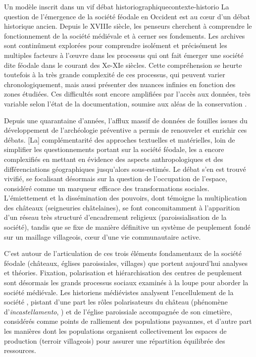 \medskip 
\begin{encadre}{Un modèle inscrit dans un vif débat historiographique}{contexte-historio}
\renewcommand{\thempfootnote}{\alph{mpfootnote}}	
\noindent \og
La question de l'émergence de la société féodale en Occident est au cœur d'un débat historique ancien.
Depuis le XVIIIe siècle, les penseurs cherchent à comprendre le fonctionnement de la société médiévale et à cerner ses fondements.
Les archives sont continûment explorées pour comprendre isolément et précisément les multiples facteurs à l'œuvre dans les processus qui ont fait émerger une société dite \og féodale\fg{} dans le courant des Xe-XIe siècles.
Cette compréhension se heurte toutefois à la très grande complexité de ces processus, qui peuvent varier chronologiquement, mais aussi présenter des nuances infinies en fonction des zones étudiées.
Ces difficultés sont encore amplifiées par l'accès aux données, très variable selon l'état de la documentation, soumise aux aléas de la conservation \textelp{}.

Depuis une quarantaine d'années, l'afflux massif de données de fouilles issues du développement de l'archéologie préventive a permis de renouveler et enrichir ces débats\textelp{}.
[La] complémentarité des approches textuelles et matérielles, loin de simplifier les questionnements portant sur la société féodale, les a encore complexifiés en mettant en évidence des aspects anthropologiques et des différenciations géographiques jusqu'alors sous-estimés.
Le débat s'en est trouvé vivifié, se focalisant désormais sur la question de l'occupation de l'espace, considéré comme un marqueur efficace des transformations sociales.
L'émiettement et la dissémination des pouvoirs, dont témoigne la multiplication des châteaux (seigneuries châtelaines), se font concomitamment à l'apparition d'un réseau très structuré d'encadrement religieux (paroissialisation de la société), tandis que se fixe de manière définitive un système de peuplement fondé sur un maillage villageois, cœur d'une vie communautaire active.

C'est autour de l'articulation de ces trois éléments fondamentaux de la société féodale (châteaux, églises paroissiales, villages) que portent aujourd'hui analyses et théories.
Fixation, polarisation et hiérarchisation des centres de peuplement sont désormais les grands processus sociaux examinés à la loupe pour aborder la société médiévale.
Les historiens médiévistes analysent l'\og encellulement\fg{} de la société \autocite{fossier_enfance_1982}, pistant d'une part les rôles polarisateurs du château (phénomène d'\textit{incastellamento}, \cite{toubert_les_1973}) et de l'église paroissiale accompagnée de son cimetière, considérés comme points de ralliement des populations paysannes, et d'autre part les manières dont les populations organisent collectivement les espaces de production (terroir villageois) pour assurer une répartition équilibrée des ressources.


\end{encadre}
